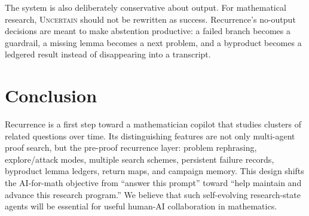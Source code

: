 \documentclass{article}
\theoremstyle{definition}
\theoremstyle{remark}
\begin{document}
The system is also deliberately conservative about output. For mathematical research, \textsc{Uncertain} should not be rewritten as success. Recurrence's no-output decisions are meant to make abstention productive: a failed branch becomes a guardrail, a missing lemma becomes a next problem, and a byproduct becomes a ledgered result instead of disappearing into a transcript.

\section{Conclusion}

Recurrence is a first step toward a mathematician copilot that studies clusters of related questions over time. Its distinguishing features are not only multi-agent proof search, but the pre-proof recurrence layer: problem rephrasing, explore/attack modes, multiple search schemes, persistent failure records, byproduct lemma ledgers, return maps, and campaign memory. This design shifts the AI-for-math objective from ``answer this prompt'' toward ``help maintain and advance this research program.'' We believe that such self-evolving research-state agents will be essential for useful human-AI collaboration in mathematics.



\end{document}
